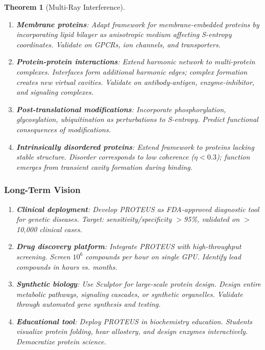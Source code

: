 \documentclass[11pt,a4paper]{article}
\newtheorem{theorem}{Theorem}[section]
\begin{document}
\begin{theorem}[Multi-Ray Interference]
\begin{enumerate}
\item \textbf{Membrane proteins}: Adapt framework for membrane-embedded proteins by incorporating lipid bilayer as anisotropic medium affecting S-entropy coordinates. Validate on GPCRs, ion channels, and transporters.

\item \textbf{Protein-protein interactions}: Extend harmonic network to multi-protein complexes. Interfaces form additional harmonic edges; complex formation creates new virtual cavities. Validate on antibody-antigen, enzyme-inhibitor, and signaling complexes.

\item \textbf{Post-translational modifications}: Incorporate phosphorylation, glycosylation, ubiquitination as perturbations to S-entropy. Predict functional consequences of modifications.

\item \textbf{Intrinsically disordered proteins}: Extend framework to proteins lacking stable structure. Disorder corresponds to low coherence ($\eta < 0.3$); function emerges from transient cavity formation during binding.
\end{enumerate}

\subsubsection{Long-Term Vision}

\begin{enumerate}
\item \textbf{Clinical deployment}: Develop PROTEUS as FDA-approved diagnostic tool for genetic diseases. Target: sensitivity/specificity $>$95\%, validated on $>$10,000 clinical cases.

\item \textbf{Drug discovery platform}: Integrate PROTEUS with high-throughput screening. Screen $10^6$ compounds per hour on single GPU. Identify lead compounds in hours vs. months.

\item \textbf{Synthetic biology}: Use Sculptor for large-scale protein design. Design entire metabolic pathways, signaling cascades, or synthetic organelles. Validate through automated gene synthesis and testing.

\item \textbf{Educational tool}: Deploy PROTEUS in biochemistry education. Students visualize protein folding, hear allostery, and design enzymes interactively. Democratize protein science.


\end{enumerate}
\end{theorem}
\end{document}
